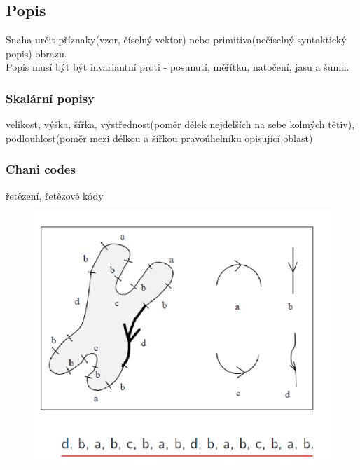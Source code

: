 \subsection{Popis}
Snaha určit příznaky(vzor, číselný vektor) nebo primitiva(nečíselný syntaktický popis) obrazu.\\
Popis musí být být invariantní proti - posunutí, měřítku, natočení, jasu a šumu.\\
\subsubsection{Skalární popisy}
velikost, výška, šířka, výstřednost(poměr délek nejdelších na sebe kolmých tětiv), podlouhlost(poměr mezi délkou a šířkou pravoúhelníku opisující oblast)\\

\subsubsection{Chani codes}
řetězení, řetězové kódy\\
\begin{figure}[H]
    \includegraphics[scale = 0.3]{images/chain_codes.png}
\end{figure}
